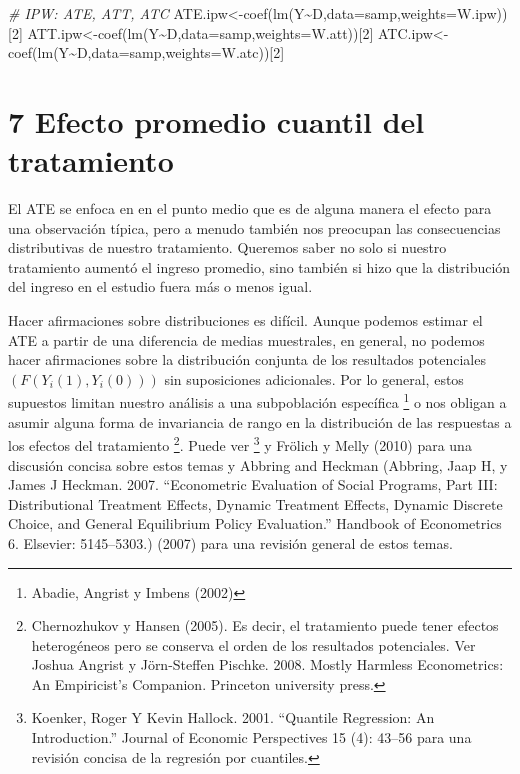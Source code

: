 \documentclass[
]{article}
\newenvironment{Shaded}{\begin{snugshade}}{\end{snugshade}}
\newcommand{\AttributeTok}[1]{\textcolor[rgb]{0.77,0.63,0.00}{#1}}
\newcommand{\CommentTok}[1]{\textcolor[rgb]{0.56,0.35,0.01}{\textit{#1}}}
\newcommand{\DecValTok}[1]{\textcolor[rgb]{0.00,0.00,0.81}{#1}}
\newcommand{\FunctionTok}[1]{\textcolor[rgb]{0.00,0.00,0.00}{#1}}
\newcommand{\NormalTok}[1]{#1}
\newcommand{\OtherTok}[1]{\textcolor[rgb]{0.56,0.35,0.01}{#1}}
\newcommand{\SpecialCharTok}[1]{\textcolor[rgb]{0.00,0.00,0.00}{#1}}
\begin{document}
\begin{Shaded}
\begin{Highlighting}[]
\CommentTok{\# IPW: ATE, ATT, ATC }
\NormalTok{ATE.ipw}\OtherTok{\textless{}{-}}\FunctionTok{coef}\NormalTok{(}\FunctionTok{lm}\NormalTok{(Y}\SpecialCharTok{\textasciitilde{}}\NormalTok{D,}\AttributeTok{data=}\NormalTok{samp,}\AttributeTok{weights=}\NormalTok{W.ipw))[}\DecValTok{2}\NormalTok{]}
\NormalTok{ATT.ipw}\OtherTok{\textless{}{-}}\FunctionTok{coef}\NormalTok{(}\FunctionTok{lm}\NormalTok{(Y}\SpecialCharTok{\textasciitilde{}}\NormalTok{D,}\AttributeTok{data=}\NormalTok{samp,}\AttributeTok{weights=}\NormalTok{W.att))[}\DecValTok{2}\NormalTok{] }
\NormalTok{ATC.ipw}\OtherTok{\textless{}{-}}\FunctionTok{coef}\NormalTok{(}\FunctionTok{lm}\NormalTok{(Y}\SpecialCharTok{\textasciitilde{}}\NormalTok{D,}\AttributeTok{data=}\NormalTok{samp,}\AttributeTok{weights=}\NormalTok{W.atc))[}\DecValTok{2}\NormalTok{]}
\end{Highlighting}
\end{Shaded}

\hypertarget{efecto-promedio-cuantil-del-tratamiento}{%
\section{7 Efecto promedio cuantil del
tratamiento}\label{efecto-promedio-cuantil-del-tratamiento}}

El ATE se enfoca en en el punto medio que es de alguna manera el efecto
para una observación típica, pero a menudo también nos preocupan las
consecuencias distributivas de nuestro tratamiento. Queremos saber no
solo si nuestro tratamiento aumentó el ingreso promedio, sino también si
hizo que la distribución del ingreso en el estudio fuera más o menos
igual.

Hacer afirmaciones sobre distribuciones es difícil. Aunque podemos
estimar el ATE a partir de una diferencia de medias muestrales, en
general, no podemos hacer afirmaciones sobre la distribución conjunta de
los resultados potenciales \((F(Y_i (1), Y_i(0)))\) sin suposiciones
adicionales. Por lo general, estos supuestos limitan nuestro análisis a
una subpoblación específica \footnote{Abadie, Angrist y Imbens (2002)} o
nos obligan a asumir alguna forma de invariancia de rango en la
distribución de las respuestas a los efectos del tratamiento
\footnote{Chernozhukov y Hansen (2005). Es decir, el tratamiento puede
  tener efectos heterogéneos pero se conserva el orden de los resultados
  potenciales. Ver Joshua Angrist y Jörn-Steffen Pischke. 2008. Mostly
  Harmless Econometrics: An Empiricist's Companion. Princeton university
  press.}. Puede ver \footnote{Koenker, Roger Y Kevin Hallock. 2001.
  ``Quantile Regression: An Introduction.'' Journal of Economic
  Perspectives 15 (4): 43--56 para una revisión concisa de la regresión
  por cuantiles.} y Frölich y Melly (2010) para una discusión concisa
sobre estos temas y Abbring and Heckman (Abbring, Jaap H, y James J
Heckman. 2007. ``Econometric Evaluation of Social Programs, Part III:
Distributional Treatment Effects, Dynamic Treatment Effects, Dynamic
Discrete Choice, and General Equilibrium Policy Evaluation.'' Handbook
of Econometrics 6. Elsevier: 5145--5303.) (2007) para una revisión
general de estos temas.
\end{document}
